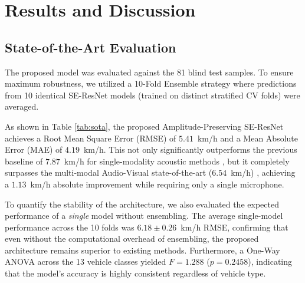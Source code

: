 \documentclass[conference]{IEEEtran}
\begin{document}
\section{Results and Discussion}
\subsection{State-of-the-Art Evaluation}
The proposed model was evaluated against the 81 blind test samples. To ensure maximum robustness, we utilized a 10-Fold Ensemble strategy where predictions from 10 identical SE-ResNet models (trained on distinct stratified CV folds) were averaged. 

As shown in Table \ref{tab:sota}, the proposed Amplitude-Preserving SE-ResNet achieves a Root Mean Square Error (RMSE) of $5.41$~km/h and a Mean Absolute Error (MAE) of $4.19$~km/h. This not only significantly outperforms the previous baseline of $7.87$~km/h for single-modality acoustic methods \cite{ref9}, but it completely surpasses the multi-modal Audio-Visual state-of-the-art ($6.54$~km/h) \cite{ref10}, achieving a $1.13$~km/h absolute improvement while requiring only a single microphone.

To quantify the stability of the architecture, we also evaluated the expected performance of a \textit{single} model without ensembling. The average single-model performance across the 10 folds was $6.18 \pm 0.26$~km/h RMSE, confirming that even without the computational overhead of ensembling, the proposed architecture remains superior to existing methods. Furthermore, a One-Way ANOVA across the 13 vehicle classes yielded $F = 1.288$ ($p = 0.2458$), indicating that the model's accuracy is highly consistent regardless of vehicle type.
\end{document}
